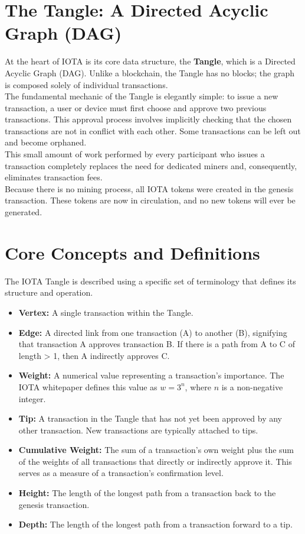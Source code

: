 \documentclass{scrbook}
\begin{document}
\section{The Tangle: A Directed Acyclic Graph (DAG)}

At the heart of IOTA is its core data structure, the \textbf{Tangle}, which is a Directed Acyclic Graph (DAG). Unlike a blockchain, the Tangle has no blocks; the graph is composed solely of individual transactions.\\

The fundamental mechanic of the Tangle is elegantly simple: to issue a new transaction, a user or device must first choose and approve two previous transactions. This approval process involves implicitly checking that the chosen transactions are not in conflict with each other. Some transactions can be left out and become orphaned.\\

This small amount of work performed by every participant who issues a transaction completely replaces the need for dedicated miners and, consequently, eliminates transaction fees.\\

Because there is no mining process, all IOTA tokens were created in the genesis transaction. These tokens are now in circulation, and no new tokens will ever be generated.

\section{Core Concepts and Definitions}

The IOTA Tangle is described using a specific set of terminology that defines its structure and operation.

\begin{itemize}
    \item \textbf{Vertex:} A single transaction within the Tangle.
    \item \textbf{Edge:} A directed link from one transaction (A) to another (B), signifying that transaction A approves transaction B. If there is a path from A to C of length > 1, then A indirectly approves C.
    \item \textbf{Weight:} A numerical value representing a transaction's importance. The IOTA whitepaper defines this value as $w = 3^n$, where $n$ is a non-negative integer.
    \item \textbf{Tip:} A transaction in the Tangle that has not yet been approved by any other transaction. New transactions are typically attached to tips.
    \item \textbf{Cumulative Weight:} The sum of a transaction's own weight plus the sum of the weights of all transactions that directly or indirectly approve it. This serves as a measure of a transaction's confirmation level.
    \item \textbf{Height:} The length of the longest path from a transaction back to the genesis transaction.
    \item \textbf{Depth:} The length of the longest path from a transaction forward to a tip.
\end{itemize}
\end{document}
